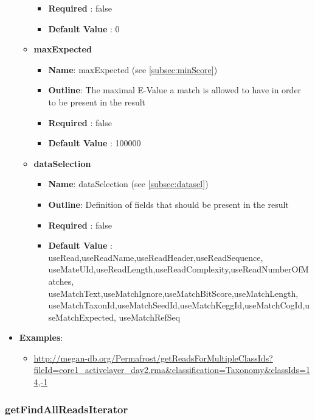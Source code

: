 \documentclass[11pt]{article}
\begin{document}
\begin{itemize}
\begin{itemize}
\begin{itemize}
					\item \textbf{Required} : false
					\item \textbf{Default Value} : 0
				\end{itemize}
			\item \textbf{maxExpected}		
				\begin{itemize}
					\item \textbf{Name}: maxExpected (see \ref{subsec:minScore})
					\item \textbf{Outline}: The maximal E-Value a match is allowed to have in order to be present in the result
					\item \textbf{Required} : false
					\item \textbf{Default Value} : 100000
				\end{itemize}
			\item \textbf{dataSelection}		
				\begin{itemize}
					\item \textbf{Name}: dataSelection (see \ref{subsec:datasel})
					\item \textbf{Outline}: Definition of fields that should be present in the result
					\item \textbf{Required} : false
					\item \textbf{Default Value} : useRead,useReadName,useReadHeader,useReadSequence, useMateUId,useReadLength,useReadComplexity,useReadNumberOfMatches, useMatchText,useMatchIgnore,useMatchBitScore,useMatchLength, useMatchTaxonId,useMatchSeedId,useMatchKeggId,useMatchCogId,useMatchExpected, useMatchRefSeq
				\end{itemize}
		\end{itemize}
	\item \textbf{Examples}:
		\begin{itemize}		
			\item \url{http://megan-db.org/Permafrost/getReadsForMultipleClassIds?fileId=core1_activelayer_day2.rma&classification=Taxonomy&classIds=14,-1}
		\end{itemize}
\end{itemize}
\subsubsection{getFindAllReadsIterator}
\end{document}

